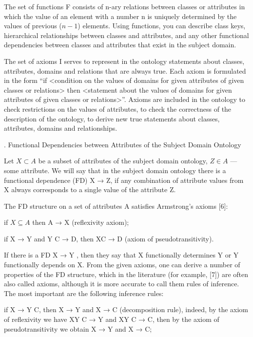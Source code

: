 \documentclass[10pt]{article}
\newcommand{\RomanNumeralCaps}[1]
    {\MakeUppercase{\romannumeral 1}}
\begin{document}
\begin{multicols}{2}
The set of functions F consists of n-ary relations
between classes or attributes in which the value of an
element with a number n is uniquely determined by the
values of previous ($n-1$) elements. Using functions,
you can describe class keys, hierarchical relationships
between classes and attributes, and any other functional
dependencies between classes and attributes that exist in
the subject domain.

The set of axioms I serves to represent in the ontology statements about classes, attributes, domains and
relations that are always true. Each axiom is formulated
in the form “if <condition on the values of domains for
given attributes of given classes or relations> then <statement about the values of domains for given attributes
of given classes or relations>”. Axioms are included
in the ontology to check restrictions on the values of
attributes, to check the correctness of the description of
the ontology, to derive new true statements about classes,
attributes, domains and relationships.
\begin{center}  \RomanNumeralCaps{3}\RomanNumeralCaps{1}\RomanNumeralCaps{1}. Functional Dependencies between Attributes of the
Subject Domain Ontology
\end{center}

Let $X \subset A$ be a subset of attributes of the subject
domain ontology, $Z \in A$ — some attribute. We will say
that in the subject domain ontology there is a functional
dependence (FD) X → Z, if any combination of attribute
values from X always corresponds to a single value of
the attribute Z.

The FD structure on a set of attributes A satisfies
Armstrong’s axioms [6]:

if $X \subseteq A$ then A → X (reflexivity axiom);

if X → Y and Y C → D, then XC → D (axiom of
pseudotransitivity).

If there is a FD X → Y , then they say that X
functionally determines Y or Y functionally depends on
X. From the given axioms, one can derive a number of
properties of the FD structure, which in the literature (for
example, [7]) are often also called axioms, although it is
more accurate to call them rules of inference. The most
important are the following inference rules:

if X → Y C, then X → Y and X → C (decomposition rule), indeed, by the axiom of reflexivity we have
XY C → Y and XY C → C, then by the axiom of
pseudotransitivity we obtain X → Y and X → C;


\end{multicols}
\end{document}
